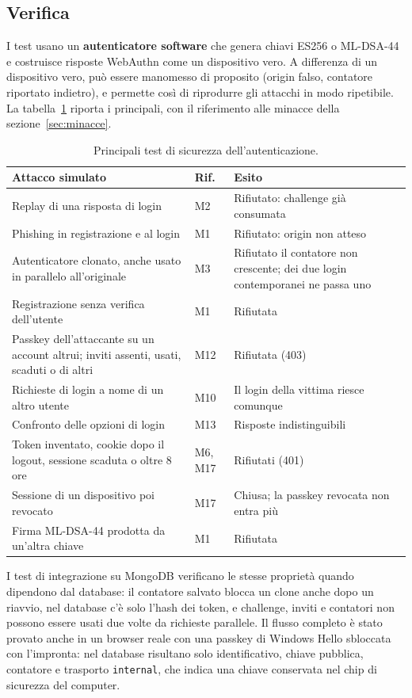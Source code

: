 \subsection{Verifica}\label{sec:fido2-test}
I test usano un \textbf{autenticatore software} che genera chiavi ES256 o ML-DSA-44 e costruisce risposte WebAuthn come un dispositivo vero. A differenza di un dispositivo vero, può essere manomesso di proposito (origin falso, contatore riportato indietro), e permette così di riprodurre gli attacchi in modo ripetibile. La tabella~\ref{tab:test-fido2} riporta i principali, con il riferimento alle minacce della sezione~\ref{sec:minacce}.

\begin{table}[H]
\centering\footnotesize
\renewcommand{\arraystretch}{1.15}
\begin{tabular}{@{}p{}p{}p{}@{}}
\toprule
Attacco simulato & Rif. & Esito\\
\midrule
Replay di una risposta di login & M2 & Rifiutato: challenge già consumata\\
Phishing in registrazione e al login & M1 & Rifiutato: origin non atteso\\
Autenticatore clonato, anche usato in parallelo all'originale & M3 & Rifiutato il contatore non crescente; dei due login contemporanei ne passa uno\\
Registrazione senza verifica dell'utente & M1 & Rifiutata\\
Passkey dell'attaccante su un account altrui; inviti assenti, usati, scaduti o di altri & M12 & Rifiutata (403)\\
Richieste di login a nome di un altro utente & M10 & Il login della vittima riesce comunque\\
Confronto delle opzioni di login & M13 & Risposte indistinguibili\\
Token inventato, cookie dopo il logout, sessione scaduta o oltre 8 ore & M6, M17 & Rifiutati (401)\\
Sessione di un dispositivo poi revocato & M17 & Chiusa; la passkey revocata non entra più\\
Firma ML-DSA-44 prodotta da un'altra chiave & M1 & Rifiutata\\
\bottomrule
\end{tabular}
\caption{Principali test di sicurezza dell'autenticazione.}\label{tab:test-fido2}
\end{table}

I test di integrazione su MongoDB verificano le stesse proprietà quando dipendono dal database: il contatore salvato blocca un clone anche dopo un riavvio, nel database c'è solo l'hash dei token, e challenge, inviti e contatori non possono essere usati due volte da richieste parallele. Il flusso completo è stato provato anche in un browser reale con una passkey di Windows Hello sbloccata con l'impronta: nel database risultano solo identificativo, chiave pubblica, contatore e trasporto \texttt{internal}, che indica una chiave conservata nel chip di sicurezza del computer.

